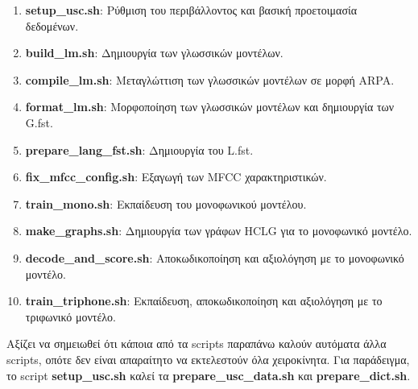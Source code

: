 \documentclass[a4paper,12pt]{article}
\begin{document}
\begin{enumerate}
    \item \textbf{setup\_usc.sh}: Ρύθμιση του περιβάλλοντος και βασική προετοιμασία δεδομένων.
    
    \item \textbf{build\_lm.sh}: Δημιουργία των γλωσσικών μοντέλων.
    
    \item \textbf{compile\_lm.sh}: Μεταγλώττιση των γλωσσικών μοντέλων σε μορφή ARPA.
    
    \item \textbf{format\_lm.sh}: Μορφοποίηση των γλωσσικών μοντέλων και δημιουργία των G.fst.
    
    \item \textbf{prepare\_lang\_fst.sh}: Δημιουργία του L.fst.
    
    \item \textbf{fix\_mfcc\_config.sh}: Εξαγωγή των MFCC χαρακτηριστικών.
    
    \item \textbf{train\_mono.sh}: Εκπαίδευση του μονοφωνικού μοντέλου.
    
    \item \textbf{make\_graphs.sh}: Δημιουργία των γράφων HCLG για το μονοφωνικό μοντέλο.
    
    \item \textbf{decode\_and\_score.sh}: Αποκωδικοποίηση και αξιολόγηση με το μονοφωνικό μοντέλο.
    
    \item \textbf{train\_triphone.sh}: Εκπαίδευση, αποκωδικοποίηση και αξιολόγηση με το τριφωνικό μοντέλο.
\end{enumerate}

Αξίζει να σημειωθεί ότι κάποια από τα scripts παραπάνω καλούν αυτόματα άλλα scripts, οπότε δεν είναι απαραίτητο να εκτελεστούν όλα χειροκίνητα. Για παράδειγμα, το script \textbf{setup\_usc.sh} καλεί τα \textbf{prepare\_usc\_data.sh} και \textbf{prepare\_dict.sh}.
\end{document}
